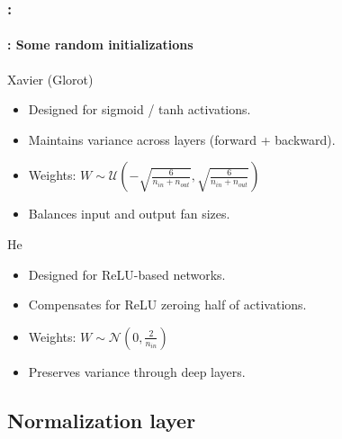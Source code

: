\documentclass[xcolor=table]{beamer}
\begin{document}
\begin{frame}
	\frametitle{\insertshortsubtitle: \insertsection}
	\framesubtitle{\insertsubsection: Some random initializations}
	
	\begin{block}{Xavier (Glorot) \cite{2010-glorot-bengio}}
		\begin{itemize}
			\item Designed for sigmoid / tanh activations.
			\item Maintains variance across layers (forward + backward).
			\item Weights: $W \sim \mathcal{U}\left(-\sqrt{\frac{6}{n_{in}+n_{out}}}, \sqrt{\frac{6}{n_{in}+n_{out}}}\right)$
			\item Balances input and output fan sizes.
		\end{itemize}
	\end{block}
	
	\begin{block}{He \cite{2015-he-al}}
		\begin{itemize}
			\item Designed for ReLU-based networks.
			\item Compensates for ReLU zeroing half of activations.
			\item Weights: $W \sim \mathcal{N}\left(0, \frac{2}{n_{in}}\right)$
			\item Preserves variance through deep layers.
		\end{itemize}
	\end{block}
	
\end{frame}

\subsection{Normalization layer}
\end{document}
